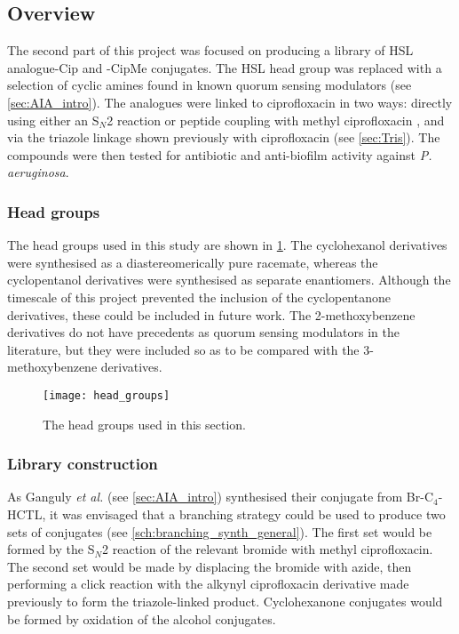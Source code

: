 \subsection{Overview}

The second part of this project was focused on producing a library of HSL analogue-Cip and -CipMe conjugates. The HSL head group was replaced with a selection of cyclic amines found in known quorum sensing modulators (see \ref{sec:AIA_intro}). 
The analogues were linked to ciprofloxacin  in two ways: directly using either an S$_N$2 reaction or peptide coupling with methyl ciprofloxacin , and via the triazole linkage shown previously with ciprofloxacin  (see \ref{sec:Tris}).
The compounds were then tested for antibiotic and anti-biofilm activity against \textit{P. aeruginosa}.

\subsubsection{Head groups\label{sec:heads}}

The head groups used in this study are shown in \ref{fig:head_groups}. The cyclohexanol derivatives were synthesised as a diastereomerically pure racemate, whereas the cyclopentanol derivatives were synthesised as separate enantiomers. 
Although the timescale of this project prevented the inclusion of the cyclopentanone derivatives, these could be included in future work.
The 2-methoxybenzene derivatives do not have precedents as quorum sensing modulators in the literature, but they were included so as to be compared with the 3-methoxybenzene derivatives.

\begin{figure}[H]
	\begin{center}
		\texttt{[image: head\_groups]}
		\caption{The head groups used in this section.\label{fig:head_groups}}
	\end{center}
\end{figure}

\subsubsection{Library construction\label{sec:branch}}

As Ganguly \textit{et al.}\cite{Ganguly2011}  (see \ref{sec:AIA_intro}) synthesised their conjugate from Br-C$_4$-HCTL, it was envisaged that a branching strategy could be used to produce two sets of conjugates (see \ref{sch:branching_synth_general}). The first set would be formed by the S$_N$2 reaction of the relevant bromide with methyl ciprofloxacin. The second set would be made by displacing the bromide with azide, then performing a click reaction with the alkynyl ciprofloxacin derivative  made previously to form the triazole-linked product. Cyclohexanone conjugates would be formed by oxidation of the alcohol conjugates.

